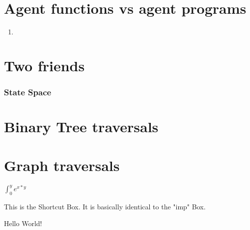 \documentclass[twocolumn]{article}
\begin{document}
\section*{Agent functions vs agent programs}
\begin{enumerate}[label=\emph{\alph*}]
\item
\end{enumerate}

\section*{Two friends}

\subsubsection*{State Space}

\section*{Binary Tree traversals}

\section*{Graph traversals}
$\boxed{\int_{0}^{y} e^{x*y}}$

\begin{shortcut}
This is the Shortcut Box.
It is basically identical to the "imp" Box.
\end{shortcut}
Hello World!
\end{document}
